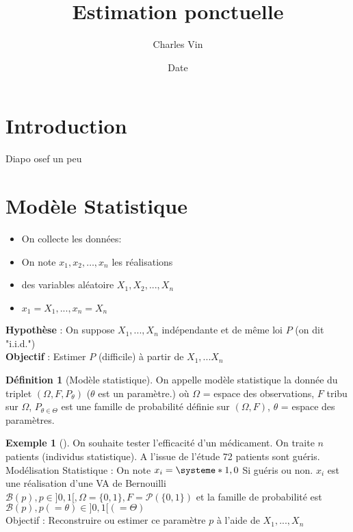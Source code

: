 \documentclass{article}
\title{Estimation ponctuelle}
\author{Charles Vin}
\date{Date}
\theoremstyle{plain}%
\theoremstyle{definition}
\newtheorem{defn}{Définition}[section]
\newtheorem{exmp}{Exemple}[section]
\theoremstyle{remark}
\begin{document}
\maketitle


\section{Introduction}
Diapo osef un peu 

\section{Modèle Statistique}
\begin{itemize}
    \item On collecte les données:
    \item On note $ x_1, x_2,\dots ,x_n $ les réalisations 
    \item des variables aléatoire $ X_1, X_2, ..., X_n $ 
    \item $ x_1 = X_1, ..., x _{n} =X_n  $ 
\end{itemize}
\textbf{Hypothèse} : On suppose $ X_1, ... , X _{n}  $  indépendante et de même loi $ P $ (on dit "i.i.d.")\\
\textbf{Objectif} : Estimer $ P $ (difficile) à partir de $X_1, ... X_n$

\begin{defn}[Modèle statistique]
    On appelle modèle statistique la donnée du triplet $ (\Omega , F, P_{\theta }) $ ($\theta$ est un paramètre.) où $ \Omega  $ = espace des observations, $ F $ tribu sur $ \Omega  $, $ P_{\theta \in \Theta } $ est une famille de probabilité définie sur $ (\Omega , F) $, $ \theta  $ = espace des paramètres.
\end{defn}

\begin{exmp}[]
    On souhaite tester l'efficacité d'un médicament. On traite $ n $ patients (individus statistique). A l'issue de l'étude 72 patients sont guéris. \\
    Modélisation Statistique : On note $ x_i = \systeme*{1, 0} $ Si guéris ou non. $ x_i $ est une réalisation d'une VA de Bernouilli $ \mathcal{B}(p), p \in ]0,1[, \Omega = \{0,1\}, F = \mathcal{P}(\{0,1\})$ et la famille de probabilité est $ \mathcal{B}(p), p(=\theta ) \in ]0,1[ (=\Theta)$ \\ 
    Objectif : Reconstruire ou estimer ce paramètre $ p $  à l'aide de $ X_1, ..., X_n $     
\end{exmp}
\end{document}
